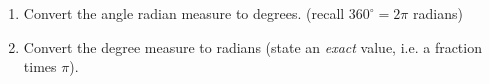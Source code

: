 \documentclass[12pt, twoside]{article}
\begin{document}
\begin{enumerate}
  \item Convert the angle radian measure to degrees. (recall $360^\circ = 2\pi$ radians)
    \begin{enumerate}
      \end{enumerate} \vspace{1cm}
  
  \item Convert the degree measure to radians (state an \emph{exact} value, i.e. a fraction times $\pi$).
    \begin{enumerate}
      \end{enumerate} %

\end{enumerate}
\end{document}

